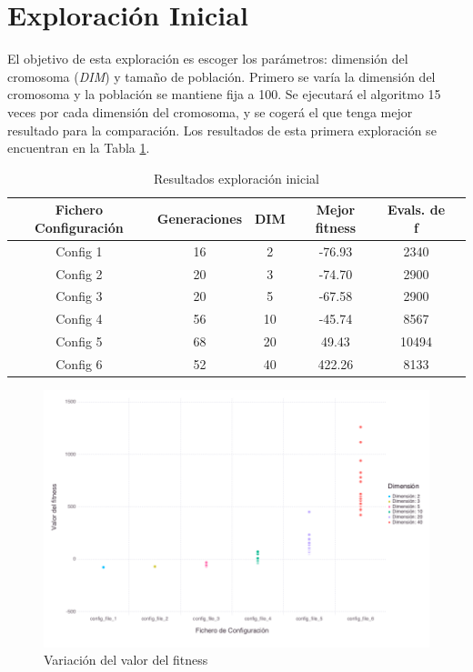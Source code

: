 \section{Exploración Inicial} \label{chapt:initial_exploration}

El objetivo de esta exploración es escoger los parámetros: dimensión del cromosoma (\textit{DIM}) y tamaño de población. Primero se varía la dimensión
del cromosoma y la población se mantiene fija a 100. Se ejecutará el algoritmo 15 veces por cada dimensión del cromosoma, y se cogerá el que 
tenga mejor resultado para la comparación. Los resultados de esta primera exploración se encuentran en la Tabla \ref{tab:fitness_variation}. 

\begin{table}[]
    \centering
    \begin{tabular}{||c|c|c|c|c|c||}
        \hline
        \textbf{Fichero Configuración} & \textbf{Generaciones} & \textbf{DIM} & \textbf{Mejor fitness} & \textbf{Evals. de f}\\ \hline
        Config 1   & 16    & 2   & -76.93    &  2340  \\ \hline
        Config 2   & 20    & 3   & -74.70    &  2900  \\ \hline
        Config 3   & 20    & 5   & -67.58    &  2900  \\ \hline
        Config 4   & 56    & 10  & -45.74    &  8567  \\ \hline
        Config 5   & 68    & 20  & 49.43     &  10494 \\ \hline
        Config 6   & 52    & 40  & 422.26    &  8133  \\ \hline
    \end{tabular}
    \caption{Resultados exploración inicial}
    \label{tab:fitness_variation}
\end{table}

\begin{figure}[]
	\centering	
	\includegraphics[scale=0.4]{figuras/config_file_1-6_Rastrigin_box_plots.png}
	\caption{ Variación del valor del fitness }
    \label{fig:box_plots}
\end{figure}

